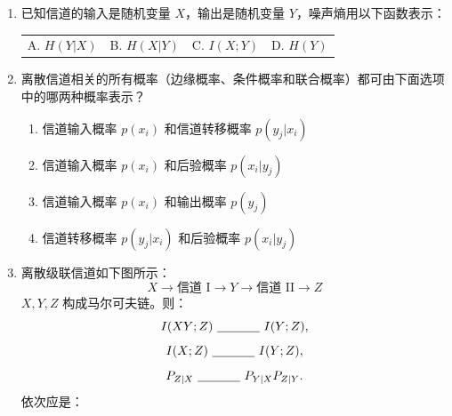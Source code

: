 \documentclass[UTF8,a4paper,12pt]{ctexart}
\newcommand{\blank}[1][3cm]{\underline{\hspace{#1}}}
\begin{document}
\begin{enumerate}[label=\arabic*., leftmargin=2em, itemsep=1.4em]
\begin{center}

图：信息维拉图
\end{center}

\begin{enumerate}[label=\Alph*. , leftmargin=2em, itemsep=0.4em]
\item 两个圆相交时的左边部分
\item 全部部分
\item 右边部分
\item 相交部分
\end{enumerate}

\item 已知信道的输入是随机变量 $X$，输出是随机变量 $Y$，噪声熵用以下函数表示：

\begin{tabular}{@{}p{}p{}p{}p{}@{}}
A. $H(Y|X)$ & B. $H(X|Y)$ & C. $I(X;Y)$ & D. $H(Y)$
\end{tabular}

\item 离散信道相关的所有概率（边缘概率、条件概率和联合概率）都可由下面选项中的哪两种概率表示？

\begin{enumerate}[label=\Alph*. , leftmargin=2em, itemsep=0.4em]
\item 信道输入概率 $p(x_i)$ 和信道转移概率 $p(y_j|x_i)$
\item 信道输入概率 $p(x_i)$ 和后验概率 $p(x_i|y_j)$
\item 信道输入概率 $p(x_i)$ 和输出概率 $p(y_j)$
\item 信道转移概率 $p(y_j|x_i)$ 和后验概率 $p(x_i|y_j)$
\end{enumerate}

\item 离散级联信道如下图所示：
\[
X\longrightarrow \text{信道 I}\longrightarrow Y\longrightarrow \text{信道 II}\longrightarrow Z
\]
$X,Y,Z$ 构成马尔可夫链。则：
\[
I(XY;Z)\ \blank[1.2cm]\ I(Y;Z),
\]
\[
I(X;Z)\ \blank[1.2cm]\ I(Y;Z),
\]
\[
P_{Z|X}\ \blank[1.2cm]\ P_{Y|X}P_{Z|Y}.
\]
依次应是：


\end{enumerate}
\end{document}
